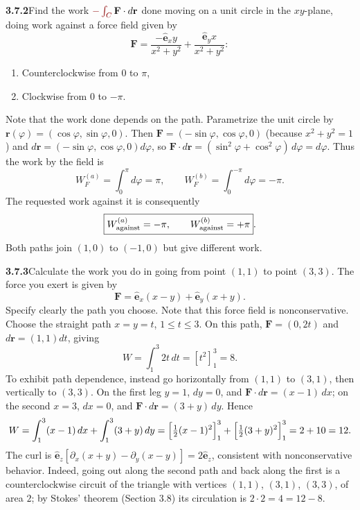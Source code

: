 \par\bigskip
\noindent\textbf{3.7.2}\quad Find the work $\erratum{-\int_C}\,\mathbf{F}\cdot d\mathbf{r}$
done moving on a unit circle in the $xy$-plane, doing work against a force
field given by
\[
\mathbf{F}=\frac{-\hat{\mathbf{e}}_{x}y}{x^{2}+y^{2}}
+\frac{\hat{\mathbf{e}}_{y}x}{x^{2}+y^{2}}:
\]
\begin{enumerate}
\item[(a)] Counterclockwise from $0$ to $\pi$,
\item[(b)] Clockwise from $0$ to $-\pi$.
\end{enumerate}
Note that the work done depends on the path.
\solution
{}
Parametrize the unit circle by
$\mathbf r(\varphi)=(\cos\varphi,\sin\varphi,0)$.
Then
$\mathbf F=(-\sin\varphi,\cos\varphi,0)$ (because $x^2+y^2=1$) and
$d\mathbf r=(-\sin\varphi,\cos\varphi,0)d\varphi$, so
$\mathbf F\cdot d\mathbf r=(\sin^2\varphi+\cos^2\varphi)\,d\varphi
=d\varphi$.
Thus the work by the field is
\[
W_F^{(a)}=\int_0^\pi d\varphi=\pi,\qquad
W_F^{(b)}=\int_0^{-\pi}d\varphi=-\pi.
\]
The requested work against it is consequently
\[
\boxed{W_{\rm against}^{(a)}=-\pi,\qquad W_{\rm against}^{(b)}=+\pi}.
\]
Both paths join $(1,0)$ to $(-1,0)$ but give different work.

\par\bigskip
\noindent\textbf{3.7.3}\quad Calculate the work you do in going from point
$(1,1)$ to point $(3,3)$. The force you exert is given by
\[
\mathbf{F}=\hat{\mathbf{e}}_{x}(x-y)+\hat{\mathbf{e}}_{y}(x+y).
\]
Specify clearly the path you choose. Note that this force field is
nonconservative.
\solution
Choose the straight path $x=y=t$, $1\le t\le3$. On this path,
$\mathbf F=(0,2t)$ and $d\mathbf r=(1,1)dt$, giving
\[
\boxed{W=\int_1^3 2t\,dt=[t^2]_1^3=8}.
\]
To exhibit path dependence, instead go horizontally from $(1,1)$
to $(3,1)$, then vertically to $(3,3)$. On the first leg $y=1$,
$dy=0$, and $\mathbf F\cdot d\mathbf r=(x-1)\,dx$; on the second $x=3$,
$dx=0$, and $\mathbf F\cdot d\mathbf r=(3+y)\,dy$. Hence
\[
W=\int_1^3(x-1)\,dx+\int_1^3(3+y)\,dy
=\Bigl[\tfrac12(x-1)^2\Bigr]_1^3+\Bigl[\tfrac12(3+y)^2\Bigr]_1^3
=2+10=12.
\]
The curl is $\hat{\mathbf e}_z[\partial_x(x+y)-\partial_y(x-y)]
=2\hat{\mathbf e}_z$, consistent with nonconservative behavior.
Indeed, going out along the second path and back along the first is a
counterclockwise circuit of the triangle with vertices $(1,1)$, $(3,1)$,
$(3,3)$, of area $2$; by Stokes' theorem (Section 3.8) its circulation
is $2\cdot2=4=12-8$.

